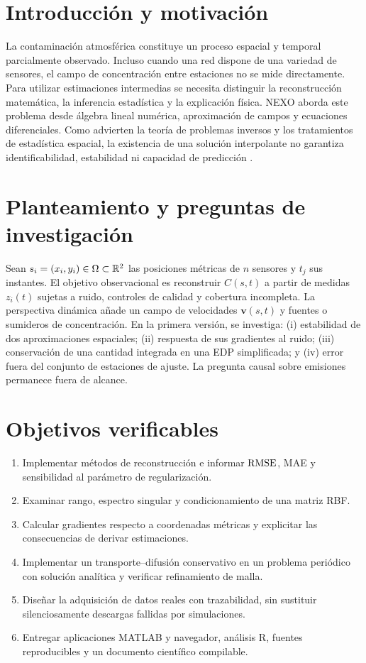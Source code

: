 \section{Introducción y motivación}\label{sec:intro}
La contaminación atmosférica constituye un proceso espacial y temporal parcialmente observado. Incluso cuando una red dispone de una variedad de sensores, el campo de concentración entre estaciones no se mide directamente. Para utilizar estimaciones intermedias se necesita distinguir la reconstrucción matemática, la inferencia estadística y la explicación física. NEXO aborda este problema desde álgebra lineal numérica, aproximación de campos y ecuaciones diferenciales. Como advierten la teoría de problemas inversos y los tratamientos de estadística espacial, la existencia de una solución interpolante no garantiza identificabilidad, estabilidad ni capacidad de predicción \cite{golub2013,cressie1993}.

\section{Planteamiento y preguntas de investigación}
Sean $s_i=(x_i,y_i)\in\Omega\subset\mathbb R^2$ las posiciones métricas de $n$ sensores y $t_j$ sus instantes. El objetivo observacional es reconstruir $C(s,t)$ a partir de medidas $z_i(t)$ sujetas a ruido, controles de calidad y cobertura incompleta. La perspectiva dinámica añade un campo de velocidades $\boldsymbol v(s,t)$ y fuentes o sumideros de concentración. En la primera versión, se investiga: (i) estabilidad de dos aproximaciones espaciales; (ii) respuesta de sus gradientes al ruido; (iii) conservación de una cantidad integrada en una EDP simplificada; y (iv) error fuera del conjunto de estaciones de ajuste. La pregunta causal sobre emisiones permanece fuera de alcance.

\section{Objetivos verificables}
\begin{enumerate}
\item Implementar métodos de reconstrucción e informar $\mathrm{RMSE}$, MAE y sensibilidad al parámetro de regularización.
\item Examinar rango, espectro singular y condicionamiento de una matriz RBF.
\item Calcular gradientes respecto a coordenadas métricas y explicitar las consecuencias de derivar estimaciones.
\item Implementar un transporte--difusión conservativo en un problema periódico con solución analítica y verificar refinamiento de malla.
\item Diseñar la adquisición de datos reales con trazabilidad, sin sustituir silenciosamente descargas fallidas por simulaciones.
\item Entregar aplicaciones MATLAB y navegador, análisis R, fuentes reproducibles y un documento científico compilable.
\end{enumerate}


